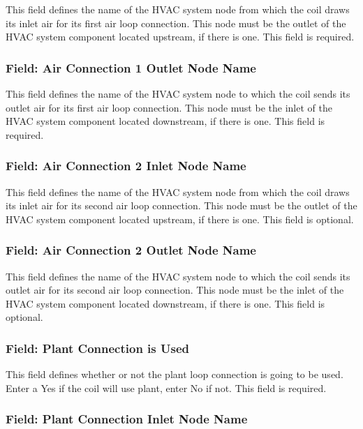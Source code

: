 This field defines the name of the HVAC system node from which the coil draws its inlet air for its first air loop connection. This node must be the outlet of the HVAC system component located upstream, if there is one. This field is required.

\subsubsection{Field: Air Connection 1 Outlet Node Name}\label{field-air-connection-1-outlet-node-name}

This field defines the name of the HVAC system node to which the coil sends its outlet air for its first air loop connection. This node must be the inlet of the HVAC system component located downstream, if there is one. This field is required.

\subsubsection{Field: Air Connection 2 Inlet Node Name}\label{field-air-connection-2-inlet-node-name}

This field defines the name of the HVAC system node from which the coil draws its inlet air for its second air loop connection. This node must be the outlet of the HVAC system component located upstream, if there is one. This field is optional.

\subsubsection{Field: Air Connection 2 Outlet Node Name}\label{field-air-connection-2-outlet-node-name}

This field defines the name of the HVAC system node to which the coil sends its outlet air for its second air loop connection. This node must be the inlet of the HVAC system component located downstream, if there is one. This field is optional.

\subsubsection{Field: Plant Connection is Used}\label{field-plant-connection-is-used}

This field defines whether or not the plant loop connection is going to be used. Enter a Yes if the coil will use plant, enter No if not. This field is required.

\subsubsection{Field: Plant Connection Inlet Node Name}\label{field-plant-connection-inlet-node-name}

